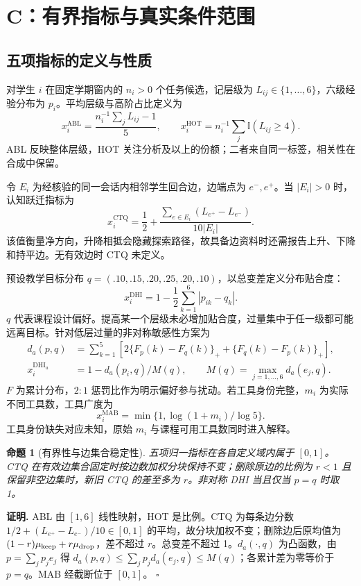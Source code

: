 \documentclass[withoutpreface,bwprint]{cumcmthesis}
\newtheorem{proposition}{命题}[section]
\renewenvironment{proof}{\par\noindent\textbf{证明. }\ignorespaces}{\unskip\hfill$\square$\par}
\newcommand{\ind}{\mathbb{I}}
\newcommand{\HOT}{\mathrm{HOT}}
\newcommand{\CTQ}{\mathrm{CTQ}}
\newcommand{\DHI}{\mathrm{DHI}}
\newcommand{\MAB}{\mathrm{MAB}}
\newcommand{\ABL}{\mathrm{ABL}}
\begin{document}
\section{C：有界指标与真实条件范围}
\subsection{五项指标的定义与性质}
对学生 $i$ 在固定学期窗内的 $n_i>0$ 个任务候选，记层级为 $L_{ij}\in\{1,\ldots,6\}$，六级经验分布为 $p_i$。平均层级与高阶占比定义为
\begin{equation}\label{eq:ablhot}
x_i^{\ABL}=\frac{n_i^{-1}\sum_jL_{ij}-1}{5},\qquad
x_i^{\HOT}=n_i^{-1}\sum_j\ind(L_{ij}\ge4).
\end{equation}
ABL 反映整体层级，HOT 关注分析及以上的份额；二者来自同一标签，相关性在合成中保留。

令 $E_i$ 为经核验的同一会话内相邻学生回合边，边端点为 $e^-,e^+$。当 $|E_i|>0$ 时，认知跃迁指标为
\begin{equation}\label{eq:ctq}
x_i^{\CTQ}=\frac12+\frac{\sum_{e\in E_i}(L_{e^+}-L_{e^-})}{10|E_i|}.
\end{equation}
该值衡量净方向，升降相抵会隐藏探索路径，故具备边资料时还需报告上升、下降和持平边。无有效边时 CTQ 未定义。

预设教学目标分布 $q=(.10,.15,.20,.25,.20,.10)$，以总变差定义分布贴合度：
\begin{equation}\label{eq:dhi}
x_i^{\DHI}=1-\frac12\sum_{k=1}^6|p_{ik}-q_k|.
\end{equation}
$q$ 代表课程设计偏好。提高某一个层级未必增加贴合度，过量集中于任一级都可能远离目标。针对低层过量的非对称敏感性方案为
\begin{equation}\label{eq:dhia}
\begin{split}
d_a(p,q)&=\sum_{k=1}^5\left[2\{F_p(k)-F_q(k)\}_++\{F_q(k)-F_p(k)\}_+\right],\\
x_i^{\DHI_a}&=1-d_a(p_i,q)/M(q),\qquad M(q)=\max_{j=1,\ldots,6}d_a(e_j,q).
\end{split}
\end{equation}
$F$ 为累计分布，$2{:}1$ 惩罚比作为明示偏好参与扰动。若工具身份完整，$m_i$ 为实际不同工具数，工具广度为
\begin{equation}\label{eq:mab}
x_i^{\MAB}=\min\{1,\log(1+m_i)/\log5\}.
\end{equation}
工具身份缺失对应未知，原始 $m_i$ 与课程可用工具数同时进入解释。

\begin{proposition}[有界性与边集合稳定性]\label{prop:bounds}
五项归一指标在各自定义域内属于 $[0,1]$。CTQ 在有效边集合固定时按边数加权分块保持不变；删除原边的比例为 $r<1$ 且保留非空边集时，新旧 CTQ 的差至多为 $r$。非对称 DHI 当且仅当 $p=q$ 时取 1。
\end{proposition}
\begin{proof}
ABL 由 $[1,6]$ 线性映射，HOT 是比例。CTQ 为每条边分数 $1/2+(L_{e^+}-L_{e^-})/10\in[0,1]$ 的平均，故分块加权不变；删除边后原均值为 $(1-r)\mu_{\rm keep}+r\mu_{\rm drop}$，差不超过 $r$。总变差不超过 1。$d_a(\cdot,q)$ 为凸函数，由 $p=\sum_jp_je_j$ 得 $d_a(p,q)\le\sum_jp_jd_a(e_j,q)\le M(q)$；各累计差为零等价于 $p=q$。MAB 经截断位于 $[0,1]$。
\end{proof}
\end{document}
